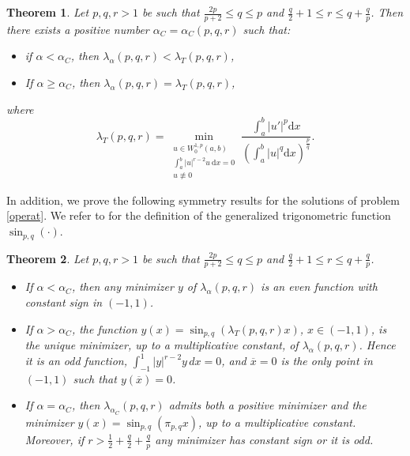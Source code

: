 \documentclass{amsart}
\newtheorem{thm}{Theorem}[section]
\theoremstyle{definition}
\theoremstyle{remark}
\begin{document}
\begin{thm}
\label{mainthm1}
Let  $p,q,r >1$ be such that $\frac{2p}{p+2}\le q\le p$ and $\frac q2+1%
\le r \le %
q+\frac q p$.  Then there exists a positive number $\alpha_C=\alpha_C(p,q,r)$ such that:
\begin{itemize}
\item[{\it (i)}] if $\alpha<\alpha_{C}$, then $\lambda_\alpha(p,q,r)<\lambda_T (p,q,r)$,
\item[{\it (ii)}] If $\alpha\ge\alpha_{C}$, then $\lambda_\alpha(p,q,r)=\lambda_T (p,q,r)$,
\end{itemize}
where \[
\lambda_T(p,q,r) =\min_{\substack{u \in W^{1,p}_0(a,b)\\ \int_a^b |u|^{r-2}u\ \text{d}x=0\\ u\not\equiv 0 }}\frac{ \int_a^b|u'|^p\text{d}x}{\left(\int_a^b|u|^q\text{d}x\right)^\frac pq}.
\]
\end{thm}
In addition, we prove the following symmetry results for the solutions of problem \eqref{operat}. We refer to  for the definition of the generalized trigonometric function $\sin_{p,q}(\cdot)$.
\begin{thm}
\label{mainthm2} Let  $p,q,r >1$ be such that $\frac{2p}{p+2}\le q\le p$ and $\frac q2+1%
\le r \le %
q+\frac q p$. 
\begin{itemize}
\item[{\it (i)}] If $\alpha<\alpha_{C}$, then any minimizer $y$ of $\lambda_\alpha(p,q,r)$ is an even function with constant sign in $(-1,1)$.
\item[{\it (ii)}] If $\alpha>\alpha_{C}$, the function $y(x)=\sin_{p,q}(\lambda_T (p,q,r)
 x)$, $x\in(-1,1)$, is the unique minimizer, up to a multiplicative constant, of $\lambda_\alpha(p,q,r)$. Hence it is an odd function, $\int_{-1}^{1} |y|^{r-2}y\,dx=0$, and $\overline x=0$ is the only point in $(-1,1)$ such that $y(\overline x)=0$.
\item[{\it (iii)}]
If $\alpha=\alpha_C$, then $\lambda_{\alpha_C}(p,q,r)$ admits both a positive minimizer and the minimizer $y(x)=\sin_{p,q}(\pi_{p,q} x)$, up to a multiplicative constant. Moreover, if $r>\frac 12+\frac q2+\frac qp$ any minimizer has constant sign or it is odd. \end{itemize}
\end{thm}
\end{document}
